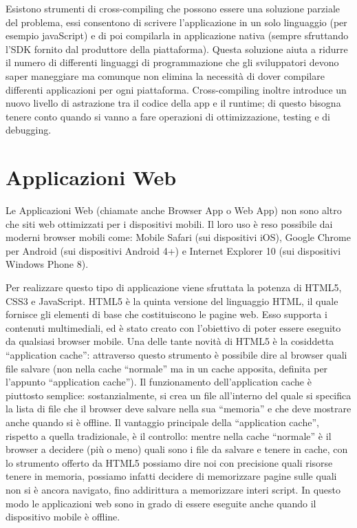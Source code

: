         Esistono strumenti di cross-compiling che possono essere una soluzione
        parziale del problema, essi consentono di scrivere l'applicazione in un solo
        linguaggio (per esempio javaScript) e di poi compilarla in applicazione
        nativa (sempre sfruttando l'SDK fornito dal produttore della
        piattaforma). Questa soluzione aiuta a ridurre il numero di differenti
        linguaggi di programmazione che gli sviluppatori devono saper maneggiare
        ma comunque non elimina la necessità di dover compilare differenti
        applicazioni per ogni piattaforma. Cross-compiling inoltre introduce un
        nuovo livello di astrazione tra il codice della app e il runtime; di
        questo bisogna tenere conto quando si vanno a fare operazioni di
        ottimizzazione, testing e di debugging.

    \section{Applicazioni Web}
    \label{sec:webapp}
        Le Applicazioni Web (chiamate anche Browser App o Web App) non sono
        altro che siti web ottimizzati per i dispositivi mobili. Il loro uso è
        reso possibile dai moderni browser mobili come: Mobile Safari (sui
        dispositivi iOS), Google Chrome per Android (sui dispositivi Android 4+)
        e Internet Explorer 10 (sui dispositivi Windows Phone 8).

        Per realizzare questo tipo di applicazione viene sfruttata la potenza di
        HTML5, CSS3 e JavaScript. HTML5 è la quinta versione del linguaggio
        HTML, il quale fornisce gli elementi di base che costituiscono le pagine
        web. Esso supporta i contenuti multimediali, ed è stato creato con
        l'obiettivo di poter essere eseguito da qualsiasi browser
        mobile\citep{White:Native-vs-Html}. Una delle tante novità di HTML5 è la
        cosiddetta ``application cache'': attraverso questo strumento è
        possibile dire al browser quali file salvare (non nella cache
        ``normale'' ma in un cache apposita, definita per l'appunto
        ``application cache''). Il funzionamento dell'application cache è
        piuttosto semplice: sostanzialmente, si crea un file all'interno del
        quale si specifica la lista di file che il browser deve salvare nella
        sua ``memoria'' e che deve mostrare anche quando si è offline. Il
        vantaggio principale della ``application cache'', rispetto a quella
        tradizionale, è il controllo: mentre nella cache ``normale'' è il
        browser a decidere (più o meno) quali sono i file da salvare e tenere in
        cache, con lo strumento offerto da HTML5 possiamo dire noi con
        precisione quali risorse tenere in memoria, possiamo infatti decidere di
        memorizzare pagine sulle quali non si è ancora navigato, fino
        addirittura a memorizzare interi script. In questo modo le applicazioni
        web sono in grado di essere eseguite anche quando il dispositivo mobile
        è offline.

